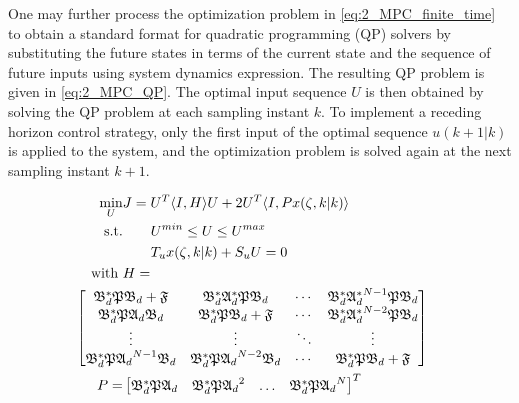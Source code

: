 One may further process the optimization problem in \eqref{eq:2_MPC_finite_time} to obtain a standard format for quadratic programming (QP) solvers by substituting the future states in terms of the current state and the sequence of future inputs using system dynamics expression. The resulting QP problem is given in \eqref{eq:2_MPC_QP}. The optimal input sequence $U$ is then obtained by solving the QP problem at each sampling instant $k$. To implement a receding horizon control strategy, only the first input of the optimal sequence $u(k+1|k)$ is applied to the system, and the optimization problem is solved again at the next sampling instant $k+1$.

\begin{equation} \label{eq:2_MPC_QP}
    \begin{aligned}
        \min_{U} &J = U^T \langle I,H \rangle U + 2U^T \langle I, P {x}(\zeta, k|k) \rangle \\
        \text{s.t.} &\qquad U^{min} \leq U \leq U^{max} \\
        &\qquad T_u {x}(\zeta, k|k) + S_u U = 0
        \, \\
        \text{with } &H = \\
        &\hspace{-3.5em }\begin{bmatrix}
            \mathfrak{B}_d^* \mathfrak{P} \mathfrak{B}_d + \mathfrak{F} & \mathfrak{B}_d^* \mathfrak{A}_d^* \mathfrak{P} \mathfrak{B}_d & \cdots &  \mathfrak{B}_d^* {\mathfrak{A}_d^*}^{N-1} \mathfrak{P} \mathfrak{B}_d \\
            \mathfrak{B}_d^* \mathfrak{P} \mathfrak{A}_d \mathfrak{B}_d & \mathfrak{B}_d^* \mathfrak{P} \mathfrak{B}_d + \mathfrak{F} & \cdots & \mathfrak{B}_d^* {\mathfrak{A}_d^*}^{N-2} \mathfrak{P} \mathfrak{B}_d \\
            \vdots & \vdots & \ddots & \vdots \\
            \mathfrak{B}_d^* \mathfrak{P} {\mathfrak{A}_d}^{N-1} \mathfrak{B}_d & \mathfrak{B}_d^* \mathfrak{P} {\mathfrak{A}_d}^{N-2} \mathfrak{B}_d & \cdots & \mathfrak{B}_d^* \mathfrak{P} \mathfrak{B}_d + \mathfrak{F}
        \end{bmatrix} \\
        P = &\begin{bmatrix}
            \mathfrak{B}_d^* \mathfrak{P} {\mathfrak{A}_d} &
            \mathfrak{B}_d^* \mathfrak{P} {\mathfrak{A}_d}^{2}  &
            \hdots &
            \mathfrak{B}_d^* \mathfrak{P} {\mathfrak{A}_d}^{N} 
        \end{bmatrix}^T \\

\end{aligned}
\end{equation}

